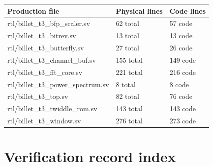 \documentclass[11pt,a4paper]{article}
\begin{document}
{\small\renewcommand{\arraystretch}{1.18}\begin{longtable}{@{}L{0.55\textwidth}|L{0.18\textwidth}|L{0.18\textwidth}@{}}\toprule

\textbf{Production file} & \textbf{Physical lines} & \textbf{Code lines}\\\midrule\endhead

rtl/\allowbreak{}billet\_\allowbreak{}t3\_\allowbreak{}bfp\_\allowbreak{}scaler.sv & 62 total & 57 code\\[2pt]\hline

rtl/\allowbreak{}billet\_\allowbreak{}t3\_\allowbreak{}bitrev.sv & 13 total & 13 code\\[2pt]\hline

rtl/\allowbreak{}billet\_\allowbreak{}t3\_\allowbreak{}butterfly.sv & 27 total & 26 code\\[2pt]\hline

rtl/\allowbreak{}billet\_\allowbreak{}t3\_\allowbreak{}channel\_\allowbreak{}buf.sv & 155 total & 149 code\\[2pt]\hline

rtl/\allowbreak{}billet\_\allowbreak{}t3\_\allowbreak{}fft\_\allowbreak{}core.sv & 221 total & 216 code\\[2pt]\hline

rtl/\allowbreak{}billet\_\allowbreak{}t3\_\allowbreak{}power\_\allowbreak{}spectrum.sv & 8 total & 8 code\\[2pt]\hline

rtl/\allowbreak{}billet\_\allowbreak{}t3\_\allowbreak{}top.sv & 82 total & 76 code\\[2pt]\hline

rtl/\allowbreak{}billet\_\allowbreak{}t3\_\allowbreak{}twiddle\_\allowbreak{}rom.sv & 143 total & 143 code\\[2pt]\hline

rtl/\allowbreak{}billet\_\allowbreak{}t3\_\allowbreak{}window.sv & 276 total & 273 code\\[2pt]\hline

\bottomrule\end{longtable}}

\section{Verification record index}
\end{document}

